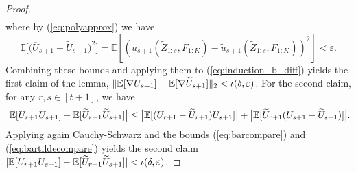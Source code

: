 \documentclass[10pt,reqno]{amsart}
\def\E{\mathbb{E}}
\def\eps{\varepsilon}
\begin{document}
\begin{proof}
\begin{align*}
\end{align*}
where by (\ref{eq:polyapprox}) we have
\begin{equation}\label{eq:bartildecompare}
\E\big[\big(\overline U_{s+1}-\widetilde U_{s+1}\big)^2\big]
=\E[(u_{s+1}(\widetilde Z_{1:s}, F_{1:K}) 
- \tilde{u}_{s+1}(\widetilde Z_{1:s},F_{1:K}))^2]
<\eps.
\end{equation}
Combining these bounds and applying them to (\ref{eq:induction_b_diff})
yields the first claim of the lemma,
$\|\EE[\nabla U_{s+1}]-\EE[\nabla \widetilde U_{s+1}]\|_2<\iota(\delta,\eps)$.
For the second claim, for any $r,s \in [t+1]$, we have
\begin{align*}
\big|\mathbb{E}[U_{r+1} U_{s+1}] - \mathbb{E}[\widetilde U_{r+1} \widetilde U_{s+1}]\big|
\leq \big|\mathbb{E}[(U_{r+1}-\widetilde U_{r+1})U_{s+1}]\big|
+\big|\mathbb{E}[\widetilde U_{r+1} (U_{s+1}-\widetilde U_{s+1})]\big|.
\end{align*}
Applying again Cauchy-Schwarz and the bounds (\ref{eq:barcompare})
and (\ref{eq:bartildecompare}) yields the second claim
$|\EE[U_{r+1} U_{s+1}] - \EE[\widetilde U_{r+1} \widetilde U_{s+1}]|
<\iota(\delta,\eps)$.
\end{proof}
\end{document}
